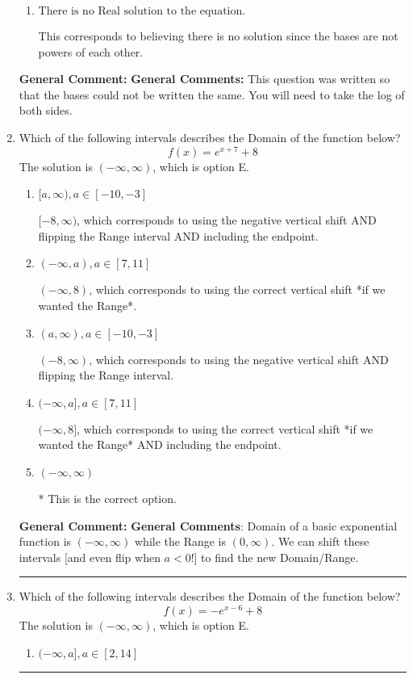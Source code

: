 \documentclass{extbook}[14pt]
\newcommand{\litem}[1]{\item #1

\rule{\textwidth}{0.4pt}}
\begin{document}
\begin{enumerate}
{\begin{enumerate}[label=\Alph*.]
$x = -3.000$, which corresponds to solving the numerators as equal while ignoring the bases are different.
\item \( \text{There is no Real solution to the equation.} \)

This corresponds to believing there is no solution since the bases are not powers of each other.
\end{enumerate}

\textbf{General Comment:} \textbf{General Comments:} This question was written so that the bases could not be written the same. You will need to take the log of both sides.
}
\litem{
Which of the following intervals describes the Domain of the function below?
\[ f(x) = e^{x+7}+8 \]
The solution is \( (-\infty, \infty) \), which is option E.\begin{enumerate}[label=\Alph*.]
\item \( [a, \infty), a \in [-10, -3] \)

$[-8, \infty)$, which corresponds to using the negative vertical shift AND flipping the Range interval AND including the endpoint.
\item \( (-\infty, a), a \in [7, 11] \)

$(-\infty, 8)$, which corresponds to using the correct vertical shift *if we wanted the Range*.
\item \( (a, \infty), a \in [-10, -3] \)

$(-8, \infty)$, which corresponds to using the negative vertical shift AND flipping the Range interval.
\item \( (-\infty, a], a \in [7, 11] \)

$(-\infty, 8]$, which corresponds to using the correct vertical shift *if we wanted the Range* AND including the endpoint.
\item \( (-\infty, \infty) \)

* This is the correct option.
\end{enumerate}

\textbf{General Comment:} \textbf{General Comments}: Domain of a basic exponential function is $(-\infty, \infty)$ while the Range is $(0, \infty)$. We can shift these intervals [and even flip when $a<0$!] to find the new Domain/Range.
}
\litem{
Which of the following intervals describes the Domain of the function below?
\[ f(x) = -e^{x-6}+8 \]
The solution is \( (-\infty, \infty) \), which is option E.\begin{enumerate}[label=\Alph*.]
\item \( (-\infty, a], a \in [2, 14] \)


\end{enumerate}}
\end{enumerate}
\end{document}
